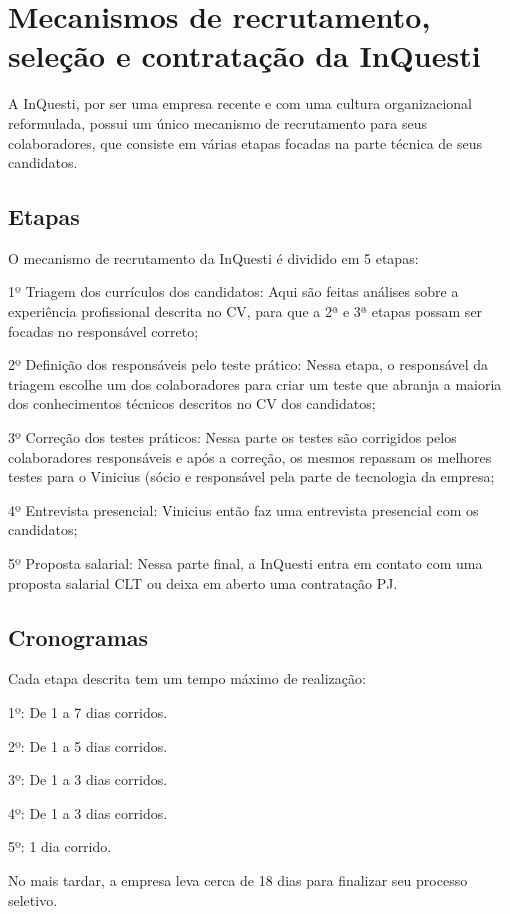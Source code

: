 \chapter{Mecanismos de recrutamento, seleção e contratação da InQuesti}
A InQuesti, por ser uma empresa recente e com uma cultura organizacional reformulada, possui um único mecanismo de recrutamento para seus colaboradores, que consiste em várias etapas focadas na parte técnica de seus candidatos.

\section{Etapas}
O mecanismo de recrutamento da InQuesti é dividido em 5 etapas:

1º Triagem dos currículos dos candidatos: Aqui são feitas análises sobre a experiência profissional descrita no CV, para que a 2ª e 3ª etapas possam ser focadas no responsável correto;

2º Definição dos responsáveis pelo teste prático: Nessa etapa, o responsável da triagem escolhe um dos colaboradores para criar um teste que abranja a maioria dos conhecimentos técnicos descritos no CV dos candidatos;

3º Correção dos testes práticos: Nessa parte os testes são corrigidos pelos colaboradores responsáveis e após a correção, os mesmos repassam os melhores testes para o Vinicius (sócio e responsável pela parte de tecnologia da empresa;

4º Entrevista presencial: Vinicius então faz uma entrevista presencial com os candidatos;

5º Proposta salarial: Nessa parte final, a InQuesti entra em contato com uma proposta salarial CLT ou deixa em aberto uma contratação PJ.

\section{Cronogramas}
Cada etapa descrita tem um tempo máximo de realização:

1º: De 1 a 7 dias corridos.

2º: De 1 a 5 dias corridos.

3º: De 1 a 3 dias corridos.

4º: De 1 a 3 dias corridos.

5º: 1 dia corrido.

No mais tardar, a empresa leva cerca de 18 dias para finalizar seu processo seletivo.

